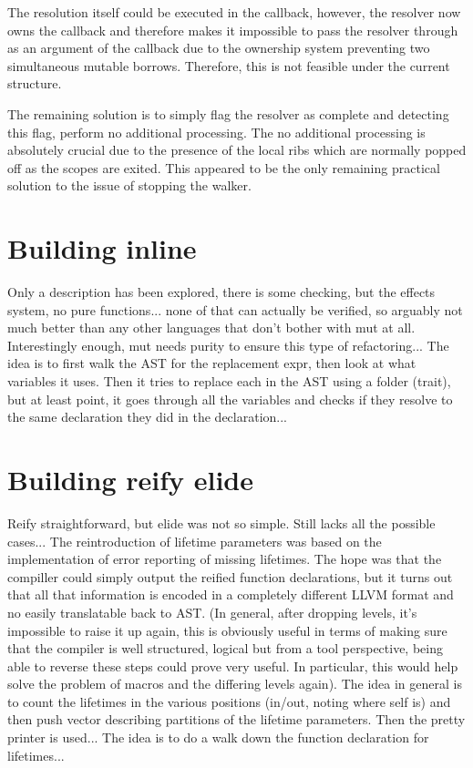 The resolution itself could be executed in the callback, however, the resolver now owns the callback and therefore makes it impossible to pass the resolver through as an argument of the callback due to the ownership system preventing two simultaneous mutable borrows. Therefore, this is not feasible under the current structure.

The remaining solution is to simply flag the resolver as complete and detecting this flag, perform no additional processing. The no additional processing is absolutely crucial due to the presence of the local ribs which are normally popped off as the scopes are exited. This appeared to be the only remaining practical solution to the issue of stopping the walker.

\section{Building inline}
Only a description has been explored, there is some checking, but the effects system, no pure functions... none of that can actually be verified, so arguably not much better than any other languages that don't bother with mut at all. Interestingly enough, mut needs purity to ensure this type of refactoring... The idea is to first walk the AST for the replacement expr, then look at what variables it uses. Then it tries to replace each in the AST using a folder (trait), but at least point, it goes through all the variables and checks if they resolve to the same declaration they did in the declaration...

\section{Building reify elide}
Reify straightforward, but elide was not so simple. Still lacks all the possible cases... The reintroduction of lifetime parameters was based on the implementation of error reporting of missing lifetimes. The hope was that the compiller could simply output the reified function declarations, but it turns out that all that information is encoded in a completely different LLVM format and no easily translatable back to AST. (In general, after dropping levels, it's impossible to raise it up again, this is obviously useful in terms of making sure that the compiler is well structured, logical but from a tool perspective, being able to reverse these steps could prove very useful. In particular, this would help solve the problem of macros and the differing levels again). The idea in general is to count the lifetimes in the various positions (in/out, noting where self is) and then push vector describing partitions of the lifetime parameters. Then the pretty printer is used... The idea is to do a walk down the function declaration for lifetimes... 

